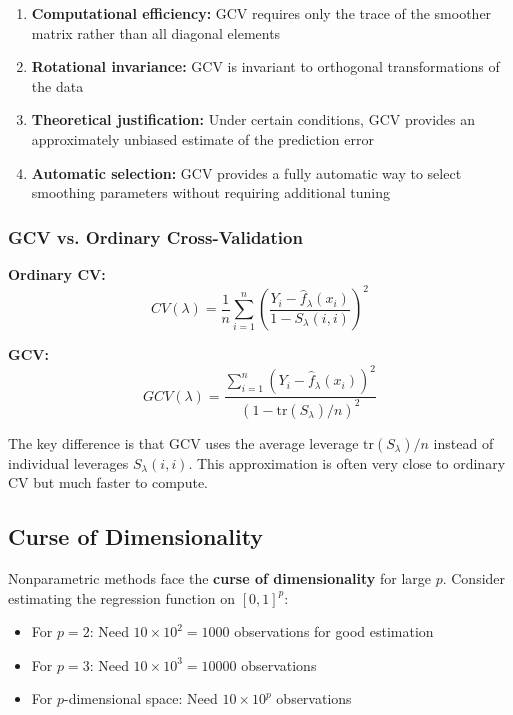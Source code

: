 \documentclass[12pt,a4paper]{article}
\begin{document}
\begin{enumerate}
    \item \textbf{Computational efficiency:} GCV requires only the trace of the smoother matrix rather than all diagonal elements
    \item \textbf{Rotational invariance:} GCV is invariant to orthogonal transformations of the data
    \item \textbf{Theoretical justification:} Under certain conditions, GCV provides an approximately unbiased estimate of the prediction error
    \item \textbf{Automatic selection:} GCV provides a fully automatic way to select smoothing parameters without requiring additional tuning
\end{enumerate}

\subsubsection{GCV vs. Ordinary Cross-Validation}

\textbf{Ordinary CV:}
\begin{equation}
CV(\lambda) = \frac{1}{n}\sum_{i=1}^n \left(\frac{Y_i - \hat{f}_\lambda(x_i)}{1 - S_\lambda(i,i)}\right)^2
\end{equation}

\textbf{GCV:}
\begin{equation}
GCV(\lambda) = \frac{\sum_{i=1}^n (Y_i - \hat{f}_\lambda(x_i))^2}{(1 - \text{tr}(S_\lambda)/n)^2}
\end{equation}

The key difference is that GCV uses the average leverage $\text{tr}(S_\lambda)/n$ instead of individual leverages $S_\lambda(i,i)$. This approximation is often very close to ordinary CV but much faster to compute.

\subsection{Curse of Dimensionality}

Nonparametric methods face the \textbf{curse of dimensionality} for large $p$. Consider estimating the regression function on $[0,1]^p$:
\begin{itemize}
    \item For $p=2$: Need $10 \times 10^2 = 1000$ observations for good estimation
    \item For $p=3$: Need $10 \times 10^3 = 10000$ observations  
    \item For $p$-dimensional space: Need $10 \times 10^p$ observations
\end{itemize}
\end{document}
